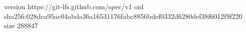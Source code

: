 version https://git-lfs.github.com/spec/v1
oid sha256:028dca95ac04abda36a16531176fabc8856bdef0332d6280def38f6012f9f220
size 288847
